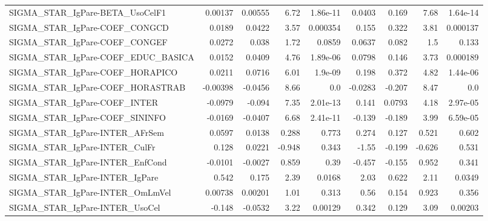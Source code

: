 \begin{tabular}{lrrrrrrrr}
SIGMA\_STAR\_IgPare-BETA\_UsoCelF1       &     0.00137 &      0.00555 &    6.72 & 1.86e-11 &     0.0403 &       0.169 &         7.68 &      1.64e-14 \\
SIGMA\_STAR\_IgPare-COEF\_CONGCD         &      0.0189 &       0.0422 &    3.57 & 0.000354 &      0.155 &       0.322 &         3.81 &      0.000137 \\
SIGMA\_STAR\_IgPare-COEF\_CONGEF         &      0.0272 &        0.038 &    1.72 &   0.0859 &     0.0637 &       0.082 &          1.5 &         0.133 \\
SIGMA\_STAR\_IgPare-COEF\_EDUC\_BASICA    &      0.0152 &       0.0409 &    4.76 & 1.89e-06 &     0.0798 &       0.146 &         3.73 &      0.000189 \\
SIGMA\_STAR\_IgPare-COEF\_HORAPICO       &      0.0211 &       0.0716 &    6.01 &  1.9e-09 &      0.198 &       0.372 &         4.82 &      1.44e-06 \\
SIGMA\_STAR\_IgPare-COEF\_HORASTRAB      &    -0.00398 &      -0.0456 &    8.66 &      0.0 &    -0.0283 &      -0.207 &         8.47 &           0.0 \\
SIGMA\_STAR\_IgPare-COEF\_INTER          &     -0.0979 &       -0.094 &    7.35 & 2.01e-13 &      0.141 &      0.0793 &         4.18 &      2.97e-05 \\
SIGMA\_STAR\_IgPare-COEF\_SININFO        &     -0.0169 &      -0.0407 &    6.68 & 2.41e-11 &     -0.139 &      -0.189 &         3.99 &      6.59e-05 \\
SIGMA\_STAR\_IgPare-INTER\_AFrSem        &      0.0597 &       0.0138 &   0.288 &    0.773 &      0.274 &       0.127 &        0.521 &         0.602 \\
SIGMA\_STAR\_IgPare-INTER\_CulFr         &       0.128 &       0.0221 &  -0.948 &    0.343 &      -1.55 &      -0.199 &       -0.626 &         0.531 \\
SIGMA\_STAR\_IgPare-INTER\_EnfCond       &     -0.0101 &      -0.0027 &   0.859 &     0.39 &     -0.457 &      -0.155 &        0.952 &         0.341 \\
SIGMA\_STAR\_IgPare-INTER\_IgPare        &       0.542 &        0.175 &    2.39 &   0.0168 &       2.03 &       0.622 &         2.11 &        0.0349 \\
SIGMA\_STAR\_IgPare-INTER\_OmLmVel       &     0.00738 &      0.00201 &    1.01 &    0.313 &       0.56 &       0.154 &        0.923 &         0.356 \\
SIGMA\_STAR\_IgPare-INTER\_UsoCel        &      -0.148 &      -0.0532 &    3.22 &  0.00129 &      0.342 &       0.129 &         3.09 &       0.00203 \\

\end{tabular}
